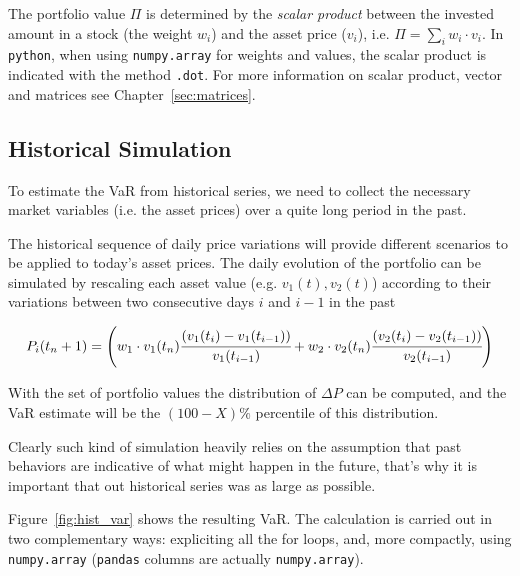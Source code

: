 The portfolio value $\Pi$ is determined by the \emph{scalar product} between the invested amount in a stock (the weight $w_i$) and the asset price ($v_i$), i.e. $\Pi = \sum_{i} w_i \cdot v_i$. In \texttt{python}, when using \texttt{numpy.array} for weights and values, the scalar product is indicated with the method \texttt{.dot}. For more information on scalar product, vector and matrices see Chapter~\ref{sec:matrices}.

\subsection{Historical Simulation}
\label{historical-simulation}

To estimate the VaR from historical series, we need to collect the necessary market variables (i.e. the asset prices) over a quite long period in the past.

The historical sequence of daily price variations will provide different scenarios to be applied to today's asset prices. 
The daily evolution of the portfolio can be simulated by rescaling each asset value (e.g. \(v_1(t), v_2(t)\)) according to their variations between two consecutive days \(i\) and \(i-1\) in the past

\begin{equation}
P_i(t_n+1) = \left(w_1 \cdot v_1(t_n)\cfrac{(v_1(t_i)-v_1(t_{i-1}))}{v_1(t_{i-1})} + w_2\cdot  v_2(t_n)\cfrac{(v_2(t_i)-v_2(t_{i-1}))}{v_2(t_{i-1})}\right)
\end{equation}

With the set of portfolio values the distribution of $\Delta P$ can be computed, and the VaR estimate will be the $(100 - X)\%$ percentile of this distribution. 

Clearly such kind of simulation heavily relies on the assumption that past behaviors are indicative of what might happen in the future, that's why it is important that out historical series was as large as possible.


Figure~\ref{fig:hist_var} shows the resulting VaR. The calculation is carried out in two complementary ways: expliciting all the for loops, and, more compactly, using \texttt{numpy.array} (\texttt{pandas} columns are actually \texttt{numpy.array}).

